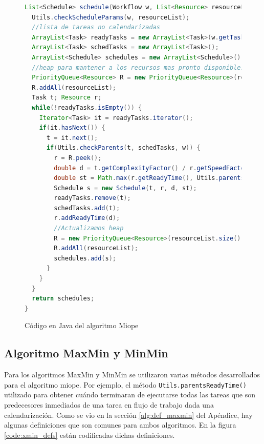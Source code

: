 \begin{figure}
\label{code:myopic}
\begin{lstlisting}[language=java]
List<Schedule> schedule(Workflow w, List<Resource> resourceList) {
  Utils.checkScheduleParams(w, resourceList);
  //lista de tareas no calendarizadas
  ArrayList<Task> readyTasks = new ArrayList<Task>(w.getTasks());
  ArrayList<Task> schedTasks = new ArrayList<Task>();
  ArrayList<Schedule> schedules = new ArrayList<Schedule>();
  //heap para mantener a los recursos mas pronto disponibles
  PriorityQueue<Resource> R = new PriorityQueue<Resource>(resourceList.size(), EarliestStartTimeComparator.getComp());
  R.addAll(resourceList);
  Task t; Resource r;
  while(!readyTasks.isEmpty()) {
    Iterator<Task> it = readyTasks.iterator();
    if(it.hasNext()) {
      t = it.next();
      if(Utils.checkParents(t, schedTasks, w)) {
        r = R.peek();
        double d = t.getComplexityFactor() / r.getSpeedFactor();
        double st = Math.max(r.getReadyTime(), Utils.parentsReadyTime(t, schedules, w));
        Schedule s = new Schedule(t, r, d, st);
        readyTasks.remove(t);
        schedTasks.add(t);
        r.addReadyTime(d);
        //Actualizamos heap
        R = new PriorityQueue<Resource>(resourceList.size(), EarliestStartTimeComparator.getComp());
        R.addAll(resourceList);
        schedules.add(s);
      }
    }
  }
  return schedules;
}
\end{lstlisting}
\caption{Código en Java del algoritmo Miope}
\end{figure}

\subsection{Algoritmo MaxMin y MinMin}
Para los algoritmos MaxMin y MinMin se utilizaron varias métodos desarrollados para el algoritmo miope. Por ejemplo, el método \texttt{Utils.parentsReadyTime()} utilizado para obtener cuándo terminaran de ejecutarse todas las tareas que son predecesores inmediados de una tarea en flujo de trabajo dada una calendarización. Como se vio en la sección \ref{alg:def_maxmin} del Apéndice, hay algunas definiciones que son comunes para ambos algoritmos. En la figura \ref{code:xmin_defs} están codificadas dichas definiciones.


